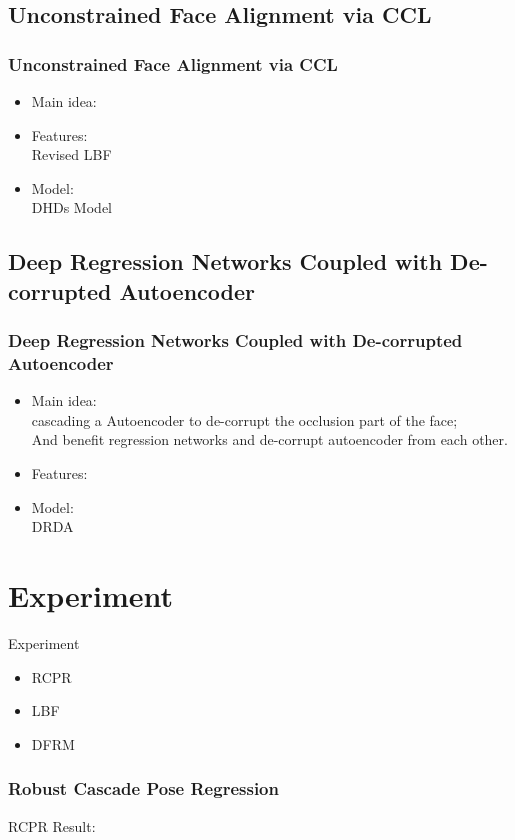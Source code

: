 \documentclass[mathserif]{beamer}%
\begin{document}
\subsection{Unconstrained Face Alignment via CCL}
\begin{frame}%
\frametitle{Unconstrained Face Alignment via CCL}
\begin{itemize}
    \item Main idea:\\
    \item Features:\\
      Revised LBF
    \item Model:\\
      DHDs Model
\end{itemize}
\end{frame}
%
\subsection{Deep Regression Networks Coupled with De-corrupted Autoencoder}
\begin{frame}%
\frametitle{Deep Regression Networks Coupled with De-corrupted Autoencoder}
\begin{itemize}
    \item Main idea:\\
      cascading a Autoencoder to de-corrupt the occlusion part of the face;\\
      And benefit regression networks and de-corrupt autoencoder from each other.
    \item Features:\\
    \item Model:\\
      DRDA
\end{itemize}
\end{frame}
%

\section{Experiment}
\begin{frame}[t]{Experiment}
    \begin{itemize}
        \item RCPR
        \item LBF
        \item DFRM
    \end{itemize}
\end{frame}
%
\subsubsection{Robust Cascade Pose Regression}
\label{ssub:RCPR}
\begin{frame}[t]{RCPR}
    Result:\\
\end{frame}
%
\end{document}
